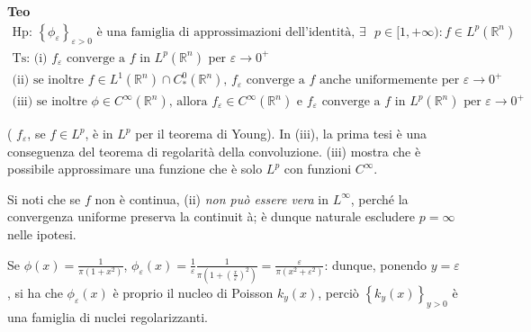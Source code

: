 \documentclass{article}
\begin{document}
\textbf{Teo}%
\begin{gather*}
\text{Hp: }\left\{ \phi _{\varepsilon }\right\} _{\varepsilon >0}\text{ \`{e}
una famiglia di approssimazioni dell'identit\`{a}, }\exists \text{ }p\in
\lbrack 1,+\infty ):f\in L^{p}\left( 
\mathbb{R}
^{n}\right) \\
\text{Ts: (i) }f_{\varepsilon }\text{ converge a }f\text{ in }L^{p}\left( 
\mathbb{R}
^{n}\right) \text{ per }\varepsilon \rightarrow 0^{+} \\
\text{(ii) se inoltre }f\in L^{1}\left( 
\mathbb{R}
^{n}\right) \cap C_{\ast }^{0}\left( 
\mathbb{R}
^{n}\right) \text{, }f_{\varepsilon }\text{ converge a }f\text{ anche
uniformemente per }\varepsilon \rightarrow 0^{+} \\
\text{(iii) se inoltre }\phi \in C^{\infty }\left( 
\mathbb{R}
^{n}\right) \text{, allora }f_{\varepsilon }\in C^{\infty }\left( 
\mathbb{R}
^{n}\right) \text{ e }f_{\varepsilon }\text{ converge a }f\text{ in }%
L^{p}\left( 
\mathbb{R}
^{n}\right) \text{ per }\varepsilon \rightarrow 0^{+}
\end{gather*}

( $f_{\varepsilon }$, se $f\in L^{p}$, \`{e} in $L^{p}$ per il teorema di
Young). In (iii), la prima tesi \`{e} una conseguenza del teorema di
regolarit\`{a} della convoluzione. (iii) mostra che \`{e} possibile
approssimare una funzione che \`{e} solo $L^{p}$ con funzioni $C^{\infty }$.

Si noti che se $f$ non \`{e} continua, (ii) \textit{non pu\`{o} essere vera}
in $L^{\infty }$, perch\'{e} la convergenza uniforme preserva la continuit%
\`{a}; \`{e} dunque naturale escludere $p=\infty $ nelle ipotesi.

Se $\phi \left( x\right) =\frac{1}{\pi \left( 1+x^{2}\right) }$, $\phi
_{\varepsilon }\left( x\right) =\frac{1}{\varepsilon }\frac{1}{\pi \left(
1+\left( \frac{x}{\varepsilon }\right) ^{2}\right) }=\frac{\varepsilon }{\pi
\left( x^{2}+\varepsilon ^{2}\right) }$: dunque, ponendo $y=\varepsilon $,
si ha che $\phi _{\varepsilon }\left( x\right) $ \`{e} proprio il nucleo di
Poisson $k_{y}\left( x\right) $, perci\`{o} $\left\{ k_{y}\left( x\right)
\right\} _{y>0}$ \`{e} una famiglia di nuclei regolarizzanti.
\end{document}
